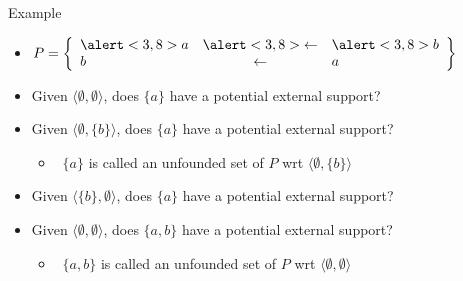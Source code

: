 \begin{frame}{Example}
  \bigskip
  \begin{itemize}
  \item<1->
    \(
    P
    =
    \left\{
      \begin{array}{lcl}
        \alert<3,8>{a} &\alert<3,8>{\leftarrow} & \alert<3,8>{b} \\
                    b  &            \leftarrow  &             a
      \end{array}
    \right\}
    \)
    \bigskip\bigskip
  \item<2-11> Given $\langle\emptyset,\emptyset\rangle$, does $\{a\}$   have a potential external support?~
    \smallskip
  \item<5-  > Given $\langle\emptyset,\{b\}    \rangle$, does $\{a\}$   have a potential external support?~
    \smallskip
    \begin{itemize}\normalsize
    \item<only@13> []\itarrow\ $\{a  \}$ is called an \alert{unfounded set} of $P$ wrt $\langle\emptyset,\{b\}    \rangle$
    \end{itemize}
  \item<7-11> Given $\langle\{b\},    \emptyset\rangle$, does $\{a\}$   have a potential external support?~
    \medskip
  \item<10- > Given $\langle\emptyset,\emptyset\rangle$, does $\{a,b\}$ have a potential external support?~
    \smallskip
    \begin{itemize}\normalsize
    \item<only@13> []\itarrow\ $\{a,b\}$ is called an \alert{unfounded set} of $P$ wrt $\langle\emptyset,\emptyset\rangle$
    \end{itemize}
  \end{itemize}
\end{frame}
